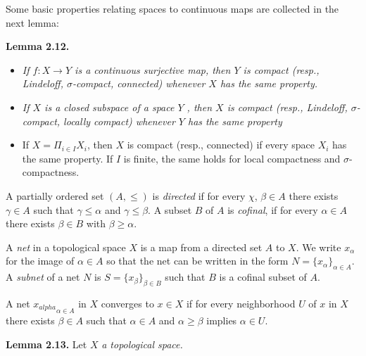 \documentclass[12pt]{article}
\begin{document}
            Some basic properties relating spaces to continuous maps are collected in the next lemma:



\textbf{Lemma 2.12.} 


        \begin{itemize}

            \item \emph{If $ f : X \to Y $ is a continuous surjective map, then $ Y $ is compact (resp., Lindeloff, $\sigma$-compact,
            connected) whenever $ X $ has the same property.}
                
            \item \emph{If $ X $ is a closed subspace of a space $ Y $ , then $ X $ is compact (resp., Lindeloff, $\sigma$-compact, locally compact)
            whenever $ Y $ has the same property}

            \item If $ X = \Pi_{i \in I} X_i $, then $ X $ is compact (resp., connected) if every space $ X_i $ has the same property. If $ I $ is
            finite, the same holds for local compactness and $\sigma$-compactness.
                
        \end{itemize}


        A partially ordered set $ (A, \leq) $ is \emph{directed} if for every $ \chi $, $ \beta \in A $ there exists $ \gamma \in A $ such that $ \gamma \leq \alpha $ and $ \gamma \leq \beta $.
    A subset $ B $ of $ A $ is \emph{cofinal}, if for every $ \alpha \in A $ there exists $ \beta \in B $ with $ \beta \geq \alpha $.
    

        A \emph{net} in a topological space $ X $ is a map from a directed set $ A $ to $ X $. We write $ x_\alpha $ for the image of $ \alpha \in A $ so
    that the net can be written in the form $ N = \{x_{\alpha}\}_{\alpha \in A} $. A \emph{subnet} of a net $ N $ is $ S = \{x_{\beta}\}_{\beta \in B} $ such that $ B $ is a
    cofinal subset of $ A $.
    

        A net ${x_{alpha}}_{\alpha \in A}$ in $ X $ converges to $ x \in X $ if for every neighborhood $ U $ of $ x $ in $ X $ there exists $ \beta \in A $ such that
    $ \alpha \in A $ and $ \alpha \geq \beta $ implies $ \alpha \in U $.    


\textbf{Lemma 2.13.} Let $ X $ \emph{a topological space.}
\end{document}
